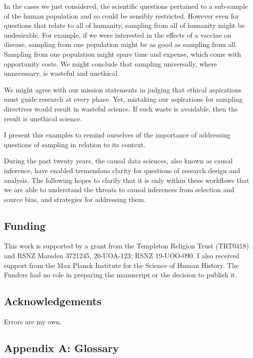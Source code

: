 \documentclass[
  single column]{article}
\begin{document}
In the cases we just considered, the scientific questions pertained to a
sub-sample of the human population and so could be sensibly restricted.
However even for questions that relate to all of humanity, sampling from
all of humanity might be undesirable. For example, if we were interested
in the effects of a vaccine on disease, sampling from one population
might be as good as sampling from all. Sampling from one population
might spare time and expense, which come with opportunity costs. We
might conclude that sampling universally, where unnecessary, is wasteful
and unethical.

We might agree with our mission statements in judging that ethical
aspirations must guide research at every phase. Yet, mistaking our
aspirations for sampling directives would result in wasteful science. If
such waste is avoidable, then the result is unethical science.

I present this examples to remind ourselves of the importance of
addressing questions of sampling in relation to its context.

During the past twenty years, the causal data sciences, also known as
causal inference, have enabled tremendous clarity for questions of
research design and analysis. The following hopes to clarify that it is
only within these workflows that we are able to understand the threats
to causal inferences from selection and source bias, and strategies for
addressing them.

\newpage{}

\subsection{Funding}\label{funding}

This work is supported by a grant from the Templeton Religion Trust
(TRT0418) and RSNZ Marsden 3721245, 20-UOA-123; RSNZ 19-UOO-090. I also
received support from the Max Planck Institute for the Science of Human
History. The Funders had no role in preparing the manuscript or the
decision to publish it.

\subsection{Acknowledgements}\label{acknowledgements}

Errors are my own.

\newpage{}

\subsection{Appendix A: Glossary}\label{appendix-a-glossary}
\end{document}
